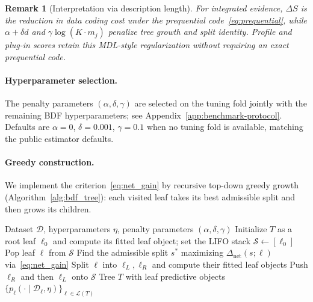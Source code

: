 \documentclass[10pt]{article} %
\newtheorem{remark}[theorem]{Remark}
\begin{document}
\begin{remark}[Interpretation via description length]\label{rem:mdl}
For integrated evidence, $\Delta S$ is the reduction in data coding cost under the prequential code~\eqref{eq:prequential}, while $\alpha+\delta d$ and $\gamma\log(K\cdot m_j)$ penalize tree growth and split identity. Profile and plug-in scores retain this MDL-style regularization without requiring an exact prequential code.
\end{remark}

\paragraph{Hyperparameter selection.}
The penalty parameters $(\alpha, \delta, \gamma)$ are selected on the tuning fold jointly with the remaining BDF hyperparameters; see Appendix~\ref{app:benchmark-protocol}. Defaults are $\alpha = 0$, $\delta = 0.001$, $\gamma = 0.1$ when no tuning fold is available, matching the public estimator defaults.

\paragraph{Greedy construction.}
We implement the criterion~\eqref{eq:net_gain} by recursive top-down greedy growth (Algorithm~\ref{alg:bdf_tree}): each visited leaf takes its best admissible split and then grows its children.

\begin{algorithm}[t]
\caption{Greedy construction of a single Bayesian distributional tree}\label{alg:bdf_tree}
\begin{algorithmic}[1]
\REQUIRE Dataset $\mathcal{D}$, hyperparameters $\eta$, penalty parameters $(\alpha, \delta, \gamma)$
\STATE Initialize $T$ as a root leaf $\ell_0$ and compute its fitted leaf object; set the LIFO stack $\mathcal{S} \leftarrow [\ell_0]$
    \STATE Pop leaf $\ell$ from $\mathcal{S}$
        \STATE Find the admissible split $s^*$ maximizing $\Delta_{\mathrm{net}}(s;\ell)$ via~\eqref{eq:net_gain}
            \STATE Split $\ell$ into $\ell_L,\ell_R$ and compute their fitted leaf objects
            \STATE Push $\ell_R$ and then $\ell_L$ onto $\mathcal{S}$
        \ENDIF
    \ENDIF
\ENDWHILE
\RETURN Tree $T$ with leaf predictive objects $\{p_\ell(\cdot \mid \mathcal{D}_\ell,\eta)\}_{\ell \in \mathcal{L}(T)}$
\end{algorithmic}
\end{algorithm}
\end{document}
